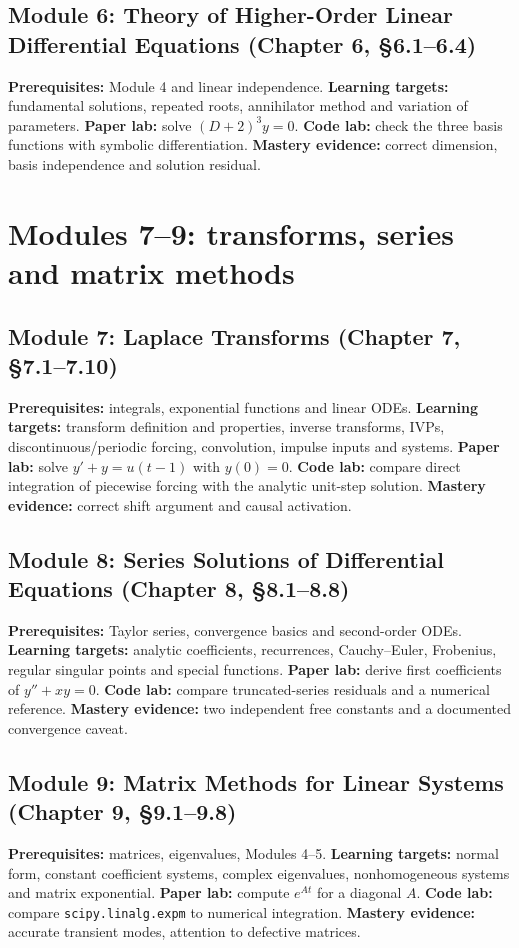 \documentclass[11pt,letterpaper,oneside]{report}
\theoremstyle{definition}\newtheorem{definition}[theorem]{Definition}
\theoremstyle{remark}\newtheorem{remark}[theorem]{Remark}
\begin{document}
\section{Module 6: Theory of Higher-Order Linear Differential Equations (Chapter 6, \S6.1--6.4)}
\textbf{Prerequisites:} Module 4 and linear independence. \textbf{Learning targets:} fundamental solutions, repeated roots, annihilator method and variation of parameters. \textbf{Paper lab:} solve $(D+2)^3y=0$. \textbf{Code lab:} check the three basis functions with symbolic differentiation. \textbf{Mastery evidence:} correct dimension, basis independence and solution residual.
\chapter{Modules 7--9: transforms, series and matrix methods}
\section{Module 7: Laplace Transforms (Chapter 7, \S7.1--7.10)}
\textbf{Prerequisites:} integrals, exponential functions and linear ODEs. \textbf{Learning targets:} transform definition and properties, inverse transforms, IVPs, discontinuous/periodic forcing, convolution, impulse inputs and systems. \textbf{Paper lab:} solve $y'+y=u(t-1)$ with $y(0)=0$. \textbf{Code lab:} compare direct integration of piecewise forcing with the analytic unit-step solution. \textbf{Mastery evidence:} correct shift argument and causal activation.
\section{Module 8: Series Solutions of Differential Equations (Chapter 8, \S8.1--8.8)}
\textbf{Prerequisites:} Taylor series, convergence basics and second-order ODEs. \textbf{Learning targets:} analytic coefficients, recurrences, Cauchy--Euler, Frobenius, regular singular points and special functions. \textbf{Paper lab:} derive first coefficients of $y''+xy=0$. \textbf{Code lab:} compare truncated-series residuals and a numerical reference. \textbf{Mastery evidence:} two independent free constants and a documented convergence caveat.
\section{Module 9: Matrix Methods for Linear Systems (Chapter 9, \S9.1--9.8)}
\textbf{Prerequisites:} matrices, eigenvalues, Modules 4--5. \textbf{Learning targets:} normal form, constant coefficient systems, complex eigenvalues, nonhomogeneous systems and matrix exponential. \textbf{Paper lab:} compute $e^{At}$ for a diagonal $A$. \textbf{Code lab:} compare \texttt{scipy.linalg.expm} to numerical integration. \textbf{Mastery evidence:} accurate transient modes, attention to defective matrices.
\end{document}
